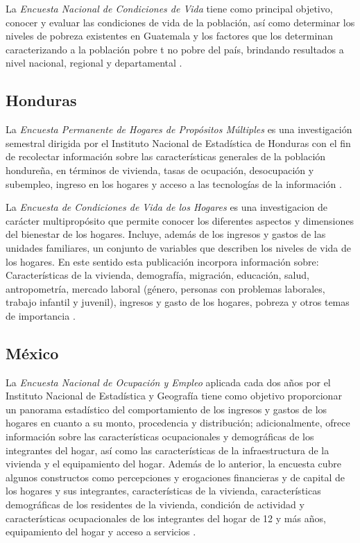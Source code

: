 \documentclass[
  12pt,
]{book}
\begin{document}
La \emph{Encuesta Nacional de Condiciones de Vida} tiene como principal objetivo, conocer y evaluar las condiciones de vida de la población, así como determinar los niveles de pobreza existentes en Guatemala y los factores que los determinan caracterizando a la población pobre t no pobre del país, brindando resultados a nivel nacional, regional y departamental \citep{INE2-GT}.

\hypertarget{honduras}{%
\subsection{Honduras}\label{honduras}}

La \emph{Encuesta Permanente de Hogares de Propósitos Múltiples} es una investigación semestral dirigida por el Instituto Nacional de Estadística de Honduras con el fin de recolectar información sobre las características generales de la población hondureña, en términos de vivienda, tasas de ocupación, desocupación y subempleo, ingreso en los hogares y acceso a las tecnologías de la información \citep{INE-HN}.

La \emph{Encuesta de Condiciones de Vida de los Hogares} es una investigacion de carácter multipropósito que permite conocer los diferentes aspectos y dimensiones del bienestar de los hogares. Incluye, además de los ingresos y gastos de las unidades familiares, un conjunto de variables que describen los niveles de vida de los hogares. En este sentido esta publicación incorpora información sobre: Características de la vivienda, demografía, migración, educación, salud, antropometría, mercado laboral (género, personas con problemas laborales, trabajo infantil y juvenil), ingresos y gasto de los hogares, pobreza y otros temas de importancia \citep{INE2-HN}.

\hypertarget{muxe9xico}{%
\subsection{México}\label{muxe9xico}}

La \emph{Encuesta Nacional de Ocupación y Empleo} aplicada cada dos años por el Instituto Nacional de Estadística y Geografía tiene como objetivo proporcionar un panorama estadístico del comportamiento de los ingresos y gastos de los hogares en cuanto a su monto, procedencia y distribución; adicionalmente, ofrece información sobre las características ocupacionales y demográficas de los integrantes del hogar, así como las características de la infraestructura de la vivienda y el equipamiento del hogar. Además de lo anterior, la encuesta cubre algunos constructos como percepciones y erogaciones financieras y de capital de los hogares y sus integrantes, características de la vivienda, características demográficas de los residentes de la vivienda, condición de actividad y características ocupacionales de los integrantes del hogar de 12 y más años, equipamiento del hogar y acceso a servicios \citep{INEGI-MX}.
\end{document}
